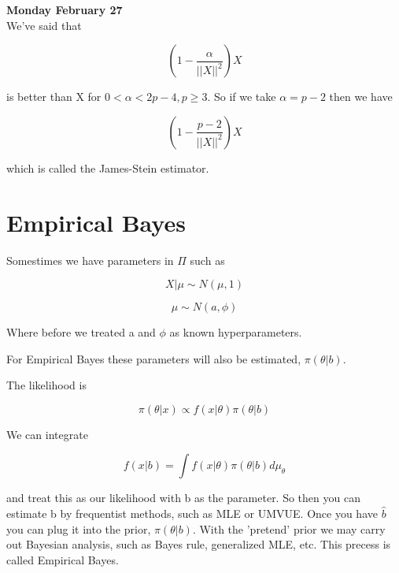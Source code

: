 \documentclass[11pt,fleqn]{book} %
\begin{document}
\textbf{Monday February 27}\\

We've said that

		$$(1 - \frac{\alpha}{||X||^2})X $$

is better than X for $0 < \alpha < 2p - 4, p \geq 3$. So if we take $\alpha = p - 2$ then we have

		$$(1 - \frac{p - 2}{||X||^2})X $$

which is called the James-Stein estimator. 

\section{Empirical Bayes}

Somestimes we have parameters in $\Pi$ such as 

		$$X|\mu \sim N(\mu, 1) $$

		$$\mu \sim N(a, \phi) $$

Where before we treated a and $\phi$ as known hyperparameters. 

For Empirical Bayes these parameters will also be estimated, $\pi(\theta|b)$.

The likelihood is 

		$$\pi(\theta|x) \propto f(x|\theta) \pi(\theta|b)$$

We can integrate

		$$f(x|b) = \int f(x|\theta)\pi(\theta|b) d\mu_\theta $$

and treat this as our likelihood with b as the parameter. So then you can estimate b by frequentist methods, such as MLE or UMVUE. Once you have $\hat{b}$ you can plug it into the prior, $\pi(\theta|b)$. With the 'pretend' prior we may carry out Bayesian analysis, such as Bayes rule, generalized MLE, etc. This precess is called Empirical Bayes. 
\end{document}
